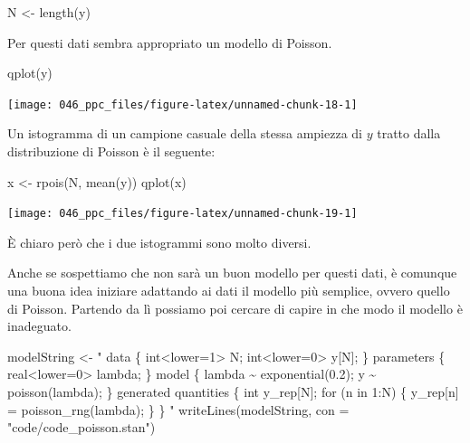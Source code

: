 \documentclass[
  11pt,
  italian,
  a4paper,
  extrafontsizes,onecolumn,openright
  ]{memoir}
\newenvironment{Shaded}{\begin{snugshade}}{\end{snugshade}}
\newcommand{\AttributeTok}[1]{\textcolor[rgb]{0.77,0.63,0.00}{#1}}
\newcommand{\FunctionTok}[1]{\textcolor[rgb]{0.00,0.00,0.00}{#1}}
\newcommand{\NormalTok}[1]{#1}
\newcommand{\OtherTok}[1]{\textcolor[rgb]{0.56,0.35,0.01}{#1}}
\newcommand{\StringTok}[1]{\textcolor[rgb]{0.31,0.60,0.02}{#1}}
\theoremstyle{definition}
\theoremstyle{definition}
\theoremstyle{definition}
\theoremstyle{definition}
\theoremstyle{remark}
\begin{document}
\begin{Shaded}
\begin{Highlighting}[]
\NormalTok{N }\OtherTok{\textless{}{-}} \FunctionTok{length}\NormalTok{(y)}
\end{Highlighting}
\end{Shaded}

\noindent
Per questi dati sembra appropriato un modello di Poisson.

\begin{Shaded}
\begin{Highlighting}[]
\FunctionTok{qplot}\NormalTok{(y)}
\end{Highlighting}
\end{Shaded}

\begin{center}\texttt{[image: 046\_ppc\_files/figure-latex/unnamed-chunk-18-1]} \end{center}

\noindent
Un istogramma di un campione casuale della stessa ampiezza di \(y\) tratto dalla distribuzione di Poisson è il seguente:

\begin{Shaded}
\begin{Highlighting}[]
\NormalTok{x }\OtherTok{\textless{}{-}} \FunctionTok{rpois}\NormalTok{(N, }\FunctionTok{mean}\NormalTok{(y))}
\FunctionTok{qplot}\NormalTok{(x)}
\end{Highlighting}
\end{Shaded}

\begin{center}\texttt{[image: 046\_ppc\_files/figure-latex/unnamed-chunk-19-1]} \end{center}

\noindent
È chiaro però che i due istogrammi sono molto diversi.

Anche se sospettiamo che non sarà un buon modello per questi dati, è comunque una buona idea iniziare adattando ai dati il modello più semplice, ovvero quello di Poisson. Partendo da lì possiamo poi cercare di capire in che modo il modello è inadeguato.

\begin{Shaded}
\begin{Highlighting}[]
\NormalTok{modelString }\OtherTok{\textless{}{-}} \StringTok{"}
\StringTok{data \{}
\StringTok{  int\textless{}lower=1\textgreater{} N;}
\StringTok{  int\textless{}lower=0\textgreater{} y[N];}
\StringTok{\}}
\StringTok{parameters \{}
\StringTok{  real\textless{}lower=0\textgreater{} lambda;}
\StringTok{\}}
\StringTok{model \{}
\StringTok{  lambda \textasciitilde{} exponential(0.2);}
\StringTok{  y \textasciitilde{} poisson(lambda);}
\StringTok{\}}
\StringTok{generated quantities \{}
\StringTok{  int y\_rep[N];}
\StringTok{  for (n in 1:N) \{}
\StringTok{    y\_rep[n] = poisson\_rng(lambda);}
\StringTok{  \}}
\StringTok{\}}
\StringTok{"}
\FunctionTok{writeLines}\NormalTok{(modelString, }\AttributeTok{con =} \StringTok{"code/code\_poisson.stan"}\NormalTok{)}
\end{Highlighting}
\end{Shaded}
\end{document}
